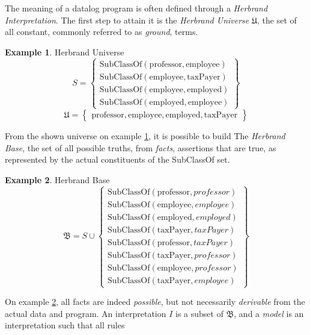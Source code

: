 \documentclass[manuscript,screen,review]{acmart}
\theoremstyle{definition}
\newtheorem{exmp}{Example}[section]
\begin{document}
The meaning of a datalog program is often\cite{datalog} defined through a \textit{Herbrand Interpretation}. The first step
to attain it is the \textit{Herbrand Universe} $\mathfrak{U}$, the set of all constant, commonly referred to as \textit{ground}, terms.
\begin{exmp}{Herbrand Universe}\label{ex2}
	\[
		S = \left\{ \begin{array}{l}
			\text{SubClassOf}(\text{professor}, \text{employee}) \\
			\text{SubClassOf}(\text{employee}, \text{taxPayer})  \\
			\text{SubClassOf}(\text{employee}, \text{employed})  \\
			\text{SubClassOf}(\text{employed}, \text{employee})
		\end{array}\right\}
	\]
	\[
		\mathfrak{U} = \left\{  \begin{array}{l}
			\text{professor}, \text{employee}, \text{employed}, \text{taxPayer}
		\end{array}\right\}
	\]
\end{exmp}
From the shown universe on example \ref{ex2}, it is possible to build The \textit{Herbrand Base}, the set of all possible truths,
from \textit{facts}, assertions that are true, as represented by the actual constituents of the SubClassOf set.
\begin{exmp}{Herbrand Base}\label{ex3}
	\[
		\mathfrak{B} = S \cup \left\{  \begin{array}{l}
			\text{SubClassOf}(\text{professor}, {professor}) \\
			\text{SubClassOf}(\text{employee}, {employee})   \\
			\text{SubClassOf}(\text{employed}, {employed})   \\
			\text{SubClassOf}(\text{taxPayer}, {taxPayer})   \\
			\text{SubClassOf}(\text{professor}, {taxPayer})  \\
			\text{SubClassOf}(\text{taxPayer}, {professor})  \\
			\text{SubClassOf}(\text{employee}, {professor})  \\
			\text{SubClassOf}(\text{taxPayer}, {employee})
		\end{array}\right\}
	\]
\end{exmp}
On example \ref{ex3}, all facts are indeed \textit{possible}, but not necessarily \textit{derivable} from the actual data and
program. An interpretation $I$ is a subset of $\mathfrak{B}$, and a \textit{model} is an interpretation such that all rules
\end{document}
